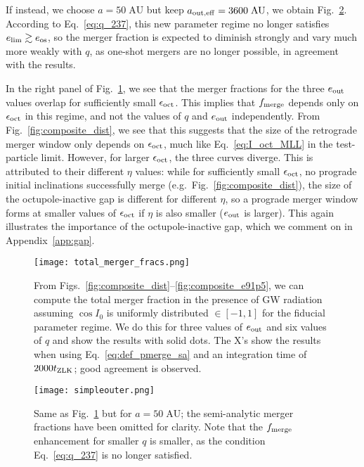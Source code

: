 \documentclass[
        fleqn,
        usenatbib,
    ]{mnras}
\begin{document}
If instead, we choose $a = 50\;\mathrm{AU}$ but keep $a_{\rm out, eff} =
3600\;\mathrm{AU}$, we obtain Fig.~\ref{fig:sweepbin_simpleouter}. According to
Eq.~\eqref{eq:q_237}, this new parameter regime no longer satisfies $e_{\lim}
\gtrsim e_{\rm os}$, so the merger fraction is expected to diminish strongly and
vary much more weakly with $q$, as one-shot mergers are no longer possible, in
agreement with the results.

In the right panel of Fig.~\ref{fig:total_merger_fracs}, we see that the merger
fractions for the three $e_{\rm out}$ values overlap for sufficiently small
$\epsilon_{\rm oct}$. This implies that $f_{\rm merge}$ depends only on
$\epsilon_{\rm oct}$ in this regime, and not the values of $q$ and $e_{\rm out}$
independently. From Fig.~\ref{fig:composite_dist}, we see that this suggests
that the size of the retrograde merger window only depends on $\epsilon_{\rm
oct}$, much like Eq.~\eqref{eq:I_oct_MLL} in the test-particle limit.
However, for larger $\epsilon_{\rm oct}$, the three curves diverge. This is
attributed to their different $\eta$ values: while for sufficiently small
$\epsilon_{\rm oct}$, no prograde initial inclinations successfully merge (e.g.\
Fig.~\ref{fig:composite_dist}), the size of the octupole-inactive gap is
different for different $\eta$, so a prograde merger window forms at smaller
values of $\epsilon_{\rm oct}$ if $\eta$ is also smaller ($e_{\rm out}$ is
larger). This again illustrates the importance of the octupole-inactive gap,
which we comment on in Appendix~\ref{app:gap}.

\begin{figure*}
    \centering
    \texttt{[image: total\_merger\_fracs.png]}
    \caption{From Figs.~\ref{fig:composite_dist}--\ref{fig:composite_e91p5},
    we can compute the total merger fraction in the presence of GW radiation
    assuming $\cos I_0$ is uniformly distributed $\in [-1, 1]$ for the fiducial
    parameter regime. We do this for three values of $e_{\rm out}$ and six
    values of $q$ and show the results with solid dots. The X's show the results
    when using Eq.~\eqref{eq:def_pmerge_sa} and an integration time of $2000
    t_{\rm ZLK}$; good agreement is observed. }\label{fig:total_merger_fracs}
\end{figure*}
\begin{figure*}
    \centering
    \texttt{[image: simpleouter.png]}
    \caption{Same as Fig.~\ref{fig:total_merger_fracs} but for $a =
    50\;\mathrm{AU}$; the semi-analytic merger fractions have been omitted for
    clarity. Note that the $f_{\rm merge}$ enhancement for smaller $q$ is
    smaller, as the condition Eq.~\eqref{eq:q_237} is no longer satisfied.
    }\label{fig:sweepbin_simpleouter}
\end{figure*}
\end{document}
